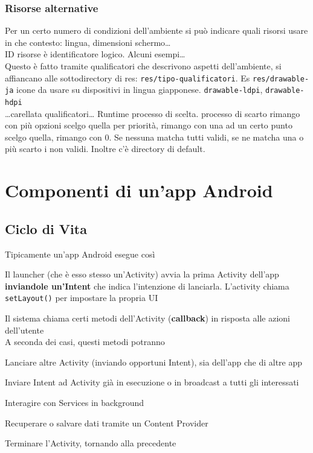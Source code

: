 \documentclass[10pt]{book}
\begin{document}
\subsection{Risorse alternative} Per un certo numero di condizioni dell'ambiente si può indicare quali risorsi usare in che contesto: lingua, dimensioni schermo\ldots\\
ID risorse è identificatore logico. Alcuni esempi\ldots\\
Questo è fatto tramite qualificatori che descrivono aspetti dell'ambiente, si affiancano alle sottodirectory di res: \texttt{res/tipo-qualificatori}. Es \texttt{res/drawable-ja} icone da usare su dispositivi in lingua giapponese. \texttt{drawable-ldpi}, \texttt{drawable-hdpi}\\
\ldots carellata qualificatori\ldots
Runtime processo di scelta.
processo di scarto rimango con più opzioni scelgo quella per priorità, rimango con una ad un certo punto scelgo quella, rimango con 0. Se nessuna matcha tutti validi, se ne matcha una o più scarto i non validi. Inoltre c'è directory di default.
\chapter{Componenti di un'app Android}\section{Ciclo di Vita}
Tipicamente un'app Android esegue così
\begin{list}{}{}
	\item Il launcher (che è esso stesso un'Activity) avvia la prima Activity dell'app \textbf{inviandole un'Intent} che indica l'intenzione di lanciarla. L'activity chiama \texttt{setLayout()} per impostare la propria UI
	\item Il sistema chiama certi metodi dell'Activity (\textbf{callback}) in risposta alle azioni dell'utente\\
	A seconda dei casi, questi metodi potranno
	\begin{list}{}{}
		\item Lanciare altre Activity (inviando opportuni Intent), sia dell'app che di altre app
		\item Inviare Intent ad Activity già in esecuzione o in broadcast a tutti gli interessati
		\item Interagire con Services in background
		\item Recuperare o salvare dati tramite un Content Provider
		\item Terminare l'Activity, tornando alla precedente
	\end{list}
\end{list}
\end{document}
